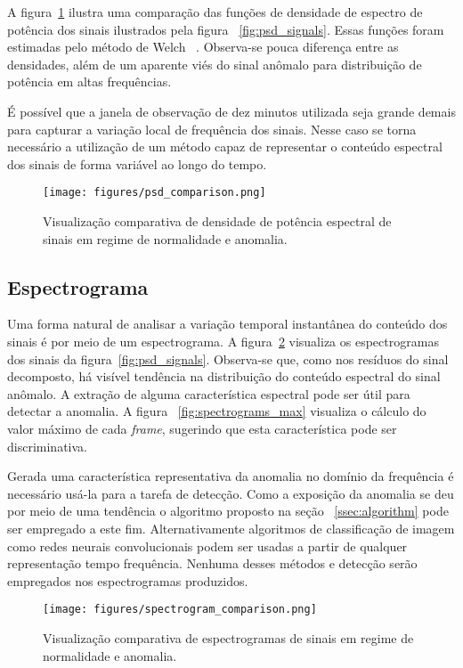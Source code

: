 A figura~\ref{fig:psd_comparison} ilustra uma comparação das funções de
densidade de espectro de potência dos sinais ilustrados pela figura
~\ref{fig:psd_signals}. Essas funções foram estimadas pelo método de Welch
~\cite{welch}. Observa-se pouca diferença entre as densidades, além de um
aparente viés do sinal anômalo para distribuição de potência em altas
frequências.

É possível que a janela de observação de dez minutos utilizada seja grande
demais para capturar a variação local de frequência dos sinais. Nesse caso
se torna necessário a utilização de um método capaz de representar o conteúdo
espectral dos sinais de forma variável ao longo do tempo.

\begin{figure}[H]
    \centering
    \texttt{[image: figures/psd\_comparison.png]}
    \caption{Visualização comparativa de densidade de potência espectral de
    sinais em regime de normalidade e anomalia.}
    \label{fig:psd_comparison}
\end{figure}

\subsection{Espectrograma}

Uma forma natural de analisar a variação temporal instantânea do conteúdo dos
sinais é por meio de um espectrograma. A figura~\ref{fig:spectrograms}
visualiza os espectrogramas dos sinais da figura~\ref{fig:psd_signals}.
Observa-se que, como nos resíduos do sinal decomposto, há visível tendência na
distribuição do conteúdo espectral do sinal anômalo. A extração de alguma
característica espectral pode ser útil para detectar a anomalia. A figura
~\ref{fig:spectrograms_max} visualiza o cálculo do valor máximo de cada
\emph{frame}, sugerindo que esta característica pode ser discriminativa.

Gerada uma característica representativa da anomalia no domínio da frequência
é necessário usá-la para a tarefa de detecção. Como a exposição da anomalia
se deu por meio de uma tendência o algoritmo proposto na seção
~\ref{ssec:algorithm} pode ser empregado a este fim. Alternativamente
algoritmos de classificação de imagem como redes neurais
convolucionais\cite{cnn} podem ser usadas a partir de qualquer representação
tempo frequência. Nenhuma desses métodos e detecção serão empregados nos
espectrogramas produzidos.

\begin{figure}[H]
    \centering
    \texttt{[image: figures/spectrogram\_comparison.png]}
    \caption{Visualização comparativa de espectrogramas de sinais em regime de
    normalidade e anomalia.}
    \label{fig:spectrograms}
\end{figure}

